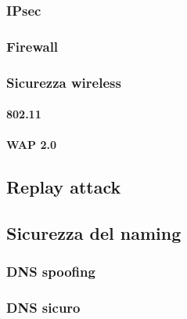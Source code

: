 \subsubsection{IPsec} %

\subsubsection{Firewall} %

\subsubsection{Sicurezza wireless} %

\paragraph{802.11}

\paragraph{WAP 2.0}

\subsection{Replay attack} %

\subsection{Sicurezza del naming} %

\subsubsection{DNS spoofing}

\subsubsection{DNS sicuro}

